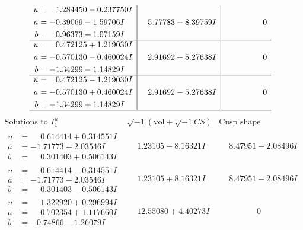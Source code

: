 \documentclass[1p]{elsarticle_modified}
\theoremstyle{definition}
\newcommand{\I}{\sqrt{-1}}
\begin{document}
$$\begin{array}{c|c|c}
\begin{aligned}
u &= \phantom{-}1.284450 - 0.237750 I \\
a &= -0.39069 - 1.59706 I \\
b &= \phantom{-}0.96373 + 1.07159 I\end{aligned}
 & \phantom{-}5.77783 - 8.39759 I & \phantom{-0.000000 } 0 \\ \hline\begin{aligned}
u &= \phantom{-}0.472125 + 1.219030 I \\
a &= -0.570130 - 0.460024 I \\
b &= -1.34299 - 1.14829 I\end{aligned}
 & \phantom{-}2.91692 + 5.27638 I & \phantom{-0.000000 } 0 \\ \hline\begin{aligned}
u &= \phantom{-}0.472125 - 1.219030 I \\
a &= -0.570130 + 0.460024 I \\
b &= -1.34299 + 1.14829 I\end{aligned}
 & \phantom{-}2.91692 - 5.27638 I & \phantom{-0.000000 } 0\\
 \hline 
 \end{array}$$\newpage$$\begin{array}{c|c|c}  
\text{Solutions to }I^u_{1}& \I (\text{vol} + \sqrt{-1}CS) & \text{Cusp shape}\\
 \hline 
\begin{aligned}
u &= \phantom{-}0.614414 + 0.314551 I \\
a &= -1.71773 + 2.03546 I \\
b &= \phantom{-}0.301403 + 0.506143 I\end{aligned}
 & \phantom{-}1.23105 - 8.16321 I & \phantom{-}8.47951 + 2.08496 I \\ \hline\begin{aligned}
u &= \phantom{-}0.614414 - 0.314551 I \\
a &= -1.71773 - 2.03546 I \\
b &= \phantom{-}0.301403 - 0.506143 I\end{aligned}
 & \phantom{-}1.23105 + 8.16321 I & \phantom{-}8.47951 - 2.08496 I \\ \hline\begin{aligned}
u &= \phantom{-}1.322920 + 0.296994 I \\
a &= \phantom{-}0.702354 + 1.117660 I \\
b &= -0.74866 - 1.26079 I\end{aligned}
 & \phantom{-}12.55080 + 4.40273 I & \phantom{-0.000000 } 0 \\ \hline\begin{aligned}

\end{aligned}
\end{array}$$
\end{document}
